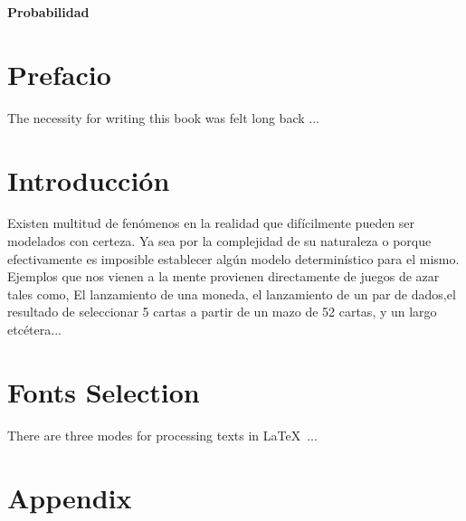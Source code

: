 \documentclass[a4paper,12pt,twoside]{book}
\begin{document}
\thispagestyle{empty}
\begin{center}
{\Huge\bf Probabilidad}%
\end{center}
\cleardoublepage
\chapter*{Prefacio}
The necessity for writing this book was felt long back ...
\cleardoublepage
\tableofcontents
\cleardoublepage
\chapter{Introducción}
Existen multitud de fenómenos en la realidad que difícilmente pueden ser modelados con certeza. Ya sea por la complejidad de su naturaleza o porque efectivamente es imposible establecer algún modelo determinístico para el mismo. Ejemplos que nos vienen a la mente provienen directamente de juegos de azar tales como, El lanzamiento de una moneda, el lanzamiento de un par de dados,el resultado de seleccionar 5 cartas a partir de un mazo de 52 cartas, y un largo etcétera...

%
\chapter{Fonts Selection}
There are three modes for processing texts in \LaTeX\ ...

\appendix
\chapter{Appendix}

%
%
\end{document}
